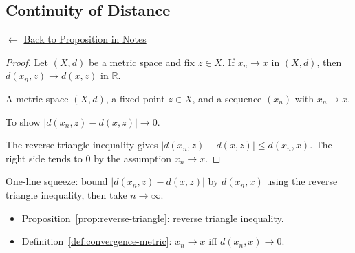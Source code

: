 
\subsection*{Continuity of Distance}
\label{prf:continuity-of-distance}

\begin{remark*}[Return]
$\leftarrow$ \hyperref[prop:continuity-of-distance]{Back to Proposition in Notes}
\end{remark*}

\begin{proof}
\Claim Let $(X,d)$ be a metric space and fix $z \in X$.
If $x_n \to x$ in $(X,d)$, then $d(x_n, z) \to d(x, z)$ in $\mathbb{R}$.

\Given A metric space $(X,d)$, a fixed point $z \in X$,
and a sequence $(x_n)$ with $x_n \to x$.

\Goal To show $|d(x_n, z) - d(x, z)| \to 0$.

\Strategy The reverse triangle inequality gives
$|d(x_n,z) - d(x,z)| \le d(x_n, x)$.
The right side tends to $0$ by the assumption $x_n \to x$.


\end{proof}

\begin{remark*}
One-line squeeze: bound $|d(x_n,z) - d(x,z)|$ by $d(x_n,x)$
using the reverse triangle inequality, then take $n \to \infty$.
\end{remark*}

\begin{remark*}[Dependencies]
\begin{itemize}
  \item Proposition~\ref{prop:reverse-triangle}: reverse triangle inequality.
  \item Definition~\ref{def:convergence-metric}: $x_n \to x$ iff $d(x_n,x) \to 0$.
\end{itemize}
\end{remark*}
